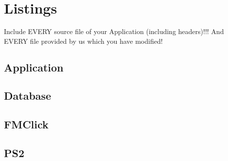 \section{Listings}
\small{

Include EVERY source file of your Application (including headers)!!!
And EVERY file provided by us which you have modified!

\subsection{Application}





\subsection{Database}







\subsection{FMClick}





\subsection{PS2}






}
